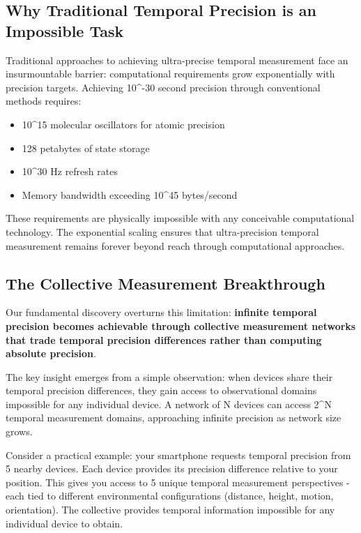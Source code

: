 \documentclass[12pt,a4paper]{article}
\begin{document}
\subsection{Why Traditional Temporal Precision is an Impossible Task}

Traditional approaches to achieving ultra-precise temporal measurement face an insurmountable barrier: computational requirements grow exponentially with precision targets. Achieving 10^{-30} second precision through conventional methods requires:

\begin{itemize}
\item 10^{15} molecular oscillators for atomic precision
\item 128 petabytes of state storage
\item 10^{30} Hz refresh rates
\item Memory bandwidth exceeding 10^{45} bytes/second
\end{itemize}

These requirements are physically impossible with any conceivable computational technology. The exponential scaling ensures that ultra-precision temporal measurement remains forever beyond reach through computational approaches.

\subsection{The Collective Measurement Breakthrough}

Our fundamental discovery overturns this limitation: \textbf{infinite temporal precision becomes achievable through collective measurement networks that trade temporal precision differences rather than computing absolute precision}.

The key insight emerges from a simple observation: when devices share their temporal precision differences, they gain access to observational domains impossible for any individual device. A network of N devices can access 2^N temporal measurement domains, approaching infinite precision as network size grows.

Consider a practical example: your smartphone requests temporal precision from 5 nearby devices. Each device provides its precision difference relative to your position. This gives you access to 5 unique temporal measurement perspectives - each tied to different environmental configurations (distance, height, motion, orientation). The collective provides temporal information impossible for any individual device to obtain.
\end{document}
